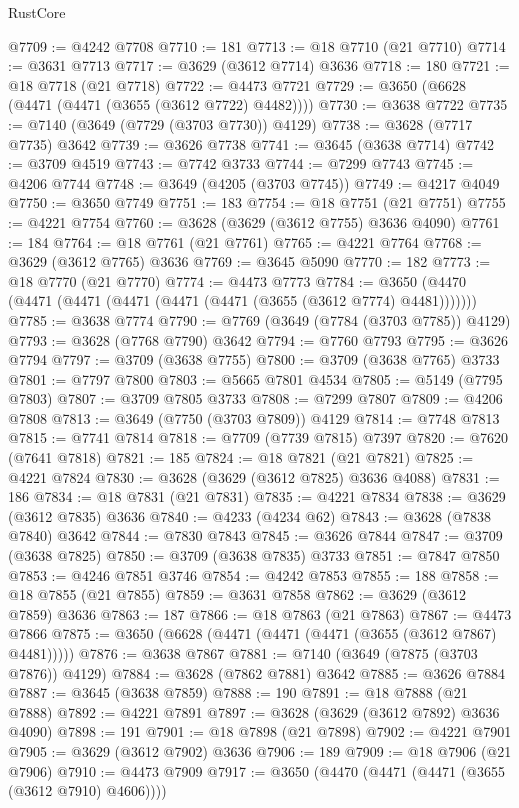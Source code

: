 \begin{lexlean}{RustCore}
\begin{coremodule}
@7709 := @4242 @7708
@7710 := 181
@7713 := @18 @7710 (@21 @7710)
@7714 := @3631 @7713
@7717 := @3629 (@3612 @7714) @3636
@7718 := 180
@7721 := @18 @7718 (@21 @7718)
@7722 := @4473 @7721
@7729 := @3650 (@6628 (@4471 (@4471 (@3655 (@3612 @7722) @4482))))
@7730 := @3638 @7722
@7735 := @7140 (@3649 (@7729 (@3703 @7730)) @4129)
@7738 := @3628 (@7717 @7735) @3642
@7739 := @3626 @7738
@7741 := @3645 (@3638 @7714)
@7742 := @3709 @4519
@7743 := @7742 @3733
@7744 := @7299 @7743
@7745 := @4206 @7744
@7748 := @3649 (@4205 (@3703 @7745))
@7749 := @4217 @4049
@7750 := @3650 @7749
@7751 := 183
@7754 := @18 @7751 (@21 @7751)
@7755 := @4221 @7754
@7760 := @3628 (@3629 (@3612 @7755) @3636 @4090)
@7761 := 184
@7764 := @18 @7761 (@21 @7761)
@7765 := @4221 @7764
@7768 := @3629 (@3612 @7765) @3636
@7769 := @3645 @5090
@7770 := 182
@7773 := @18 @7770 (@21 @7770)
@7774 := @4473 @7773
@7784 := @3650 (@4470 (@4471 (@4471 (@4471 (@4471 (@4471 (@3655 (@3612 @7774) @4481)))))))
@7785 := @3638 @7774
@7790 := @7769 (@3649 (@7784 (@3703 @7785)) @4129)
@7793 := @3628 (@7768 @7790) @3642
@7794 := @7760 @7793
@7795 := @3626 @7794
@7797 := @3709 (@3638 @7755)
@7800 := @3709 (@3638 @7765) @3733
@7801 := @7797 @7800
@7803 := @5665 @7801 @4534
@7805 := @5149 (@7795 @7803)
@7807 := @3709 @7805 @3733
@7808 := @7299 @7807
@7809 := @4206 @7808
@7813 := @3649 (@7750 (@3703 @7809)) @4129
@7814 := @7748 @7813
@7815 := @7741 @7814
@7818 := @7709 (@7739 @7815) @7397
@7820 := @7620 (@7641 @7818)
@7821 := 185
@7824 := @18 @7821 (@21 @7821)
@7825 := @4221 @7824
@7830 := @3628 (@3629 (@3612 @7825) @3636 @4088)
@7831 := 186
@7834 := @18 @7831 (@21 @7831)
@7835 := @4221 @7834
@7838 := @3629 (@3612 @7835) @3636
@7840 := @4233 (@4234 @62)
@7843 := @3628 (@7838 @7840) @3642
@7844 := @7830 @7843
@7845 := @3626 @7844
@7847 := @3709 (@3638 @7825)
@7850 := @3709 (@3638 @7835) @3733
@7851 := @7847 @7850
@7853 := @4246 @7851 @3746
@7854 := @4242 @7853
@7855 := 188
@7858 := @18 @7855 (@21 @7855)
@7859 := @3631 @7858
@7862 := @3629 (@3612 @7859) @3636
@7863 := 187
@7866 := @18 @7863 (@21 @7863)
@7867 := @4473 @7866
@7875 := @3650 (@6628 (@4471 (@4471 (@4471 (@3655 (@3612 @7867) @4481)))))
@7876 := @3638 @7867
@7881 := @7140 (@3649 (@7875 (@3703 @7876)) @4129)
@7884 := @3628 (@7862 @7881) @3642
@7885 := @3626 @7884
@7887 := @3645 (@3638 @7859)
@7888 := 190
@7891 := @18 @7888 (@21 @7888)
@7892 := @4221 @7891
@7897 := @3628 (@3629 (@3612 @7892) @3636 @4090)
@7898 := 191
@7901 := @18 @7898 (@21 @7898)
@7902 := @4221 @7901
@7905 := @3629 (@3612 @7902) @3636
@7906 := 189
@7909 := @18 @7906 (@21 @7906)
@7910 := @4473 @7909
@7917 := @3650 (@4470 (@4471 (@4471 (@3655 (@3612 @7910) @4606))))

\end{coremodule}
\end{lexlean}
